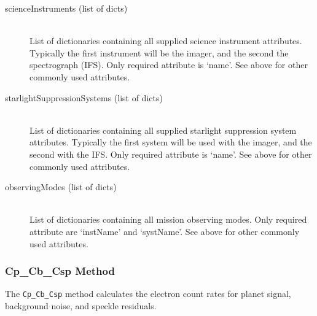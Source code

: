 \documentclass[cleanfoot]{asme2ej}
\begin{document}
\begin{itemize}
\begin{description}
    \item[scienceInstruments (list of dicts)] \hfill \\  List of dictionaries containing all supplied science instrument attributes.  Typically the first instrument will be the imager, and the second the spectrograph (IFS). Only required attribute is `name'.  See above for other commonly used attributes. 
    \item[starlightSuppressionSystems (list of dicts)] \hfill \\  List of dictionaries containing all supplied starlight suppression system attributes. Typically the first system will be used with the imager, and the second with the IFS. Only required attribute is `name'. See above for other commonly used attributes.
    \item[observingModes (list of dicts)] \hfill \\  List of dictionaries containing all mission observing modes. Only required attribute are `instName' and `systName'. See above for other commonly used attributes.
\end{description}
\end{itemize}

\subsubsection{Cp\_Cb\_Csp Method} \label{sec:CpCbCsptask}
The \verb+Cp_Cb_Csp+ method calculates the electron count rates for planet signal, background noise, and speckle residuals.
\end{document}

